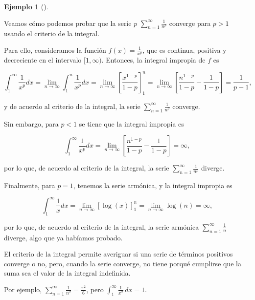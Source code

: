 \documentclass[
  a4paper,
]{scrreport}
\theoremstyle{definition}
\newtheorem{example}{Ejemplo}[chapter]
\theoremstyle{plain}
\theoremstyle{definition}
\theoremstyle{definition}
\theoremstyle{plain}
\theoremstyle{plain}
\theoremstyle{remark}
\begin{document}
\begin{example}[]\protect\hypertarget{exm-criterio-integral}{}\label{exm-criterio-integral}

Veamos cómo podemos probar que la serie \(p\)
\(\sum_{n=1}^\infty \frac{1}{n^p}\) converge para \(p>1\) usando el
criterio de la integral.

Para ello, consideramos la función \(f(x)=\frac{1}{x^p}\), que es
continua, positiva y decreciente en el intervalo \([1,\infty)\).
Entonces, la integral impropia de \(f\) es

\[
\int_1^\infty \frac{1}{x^p}dx = \lim_{n\to\infty} \int_1^n \frac{1}{x^p}dx = \lim_{n\to\infty} \left[\frac{x^{1-p}}{1-p}\right]_1^n = \lim_{n\to\infty} \left[\frac{n^{1-p}}{1-p}-\frac{1}{1-p}\right] = \frac{1}{p-1},
\]

y de acuerdo al criterio de la integral, la serie
\(\sum_{n=1}^\infty \frac{1}{n^p}\) converge.

Sin embargo, para \(p<1\) se tiene que la integral impropia es

\[
\int_1^\infty \frac{1}{x^p}dx = \lim_{n\to\infty} \left[\frac{n^{1-p}}{1-p}-\frac{1}{1-p}\right] = \infty,
\]

por lo que, de acuerdo al criterio de la integral, la serie
\(\sum_{n=1}^\infty \frac{1}{n^p}\) diverge.

Finalmente, para \(p=1\), tenemos la serie armónica, y la integral
impropia es

\[
\int_1^\infty \frac{1}{x}dx = \lim_{n\to\infty} \left[\log(x)\right]_1^n = \lim_{n\to\infty} \log(n) = \infty,
\]

por lo que, de acuerdo al criterio de la integral, la serie armónica
\(\sum_{n=1}^\infty \frac{1}{n}\) diverge, algo que ya habíamos probado.

\end{example}

\begin{tcolorbox}[enhanced jigsaw, leftrule=.75mm, colbacktitle=quarto-callout-warning-color!10!white, toprule=.15mm, opacityback=0, opacitybacktitle=0.6, toptitle=1mm, breakable, bottomtitle=1mm, colframe=quarto-callout-warning-color-frame, rightrule=.15mm, titlerule=0mm, title=\textcolor{quarto-callout-warning-color}{\faExclamationTriangle}\hspace{0.5em}{Advertencia}, arc=.35mm, left=2mm, bottomrule=.15mm, colback=white, coltitle=black]

El criterio de la integral permite averiguar si una serie de términos
positivos converge o no, pero, cuando la serie converge, no tiene porqué
cumplirse que la suma sea el valor de la integral indefinida.

Por ejemplo, \(\sum_{n=1}^\infty \frac{1}{n^2} = \frac{\pi^2}{6}\), pero
\(\int_1^\infty \frac{1}{x^2}\,dx = 1\).

\end{tcolorbox}
\end{document}

